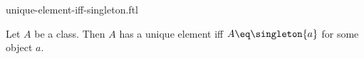 \documentclass{stex}
\begin{document}
\begin{smodule}{unique-element-iff-singleton.ftl}


\begin{proposition}[forthel,id=HasUniqueElementIffIsSingletonClassProp]
  Let $A$ be a class.
  Then $A$ has a unique element iff $A \eq \singleton{a}$ for some object $a$.
\end{proposition}

\end{smodule}
\end{document}

